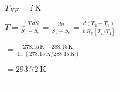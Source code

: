 \( T_{KF} = ? \, \text{K} \)  

\( T = \frac{\int T \, dS}{S_o - S_e} = \frac{du}{S_o - S_e} = \frac{d \left( T_2 - T_1 \right)}{k \, R_u \left[ T_2 / T_1 \right]} \)  

\( = \frac{278.15 \, \text{K} - 288.15 \, \text{K}}{\ln \left( 278.15 \, \text{K} / 288.15 \, \text{K} \right)} \)  

\( = 293.72 \, \text{K} \)  

---